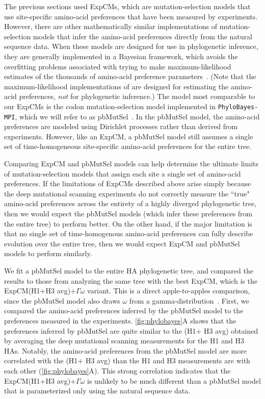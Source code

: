 \documentclass[11pt]{article}
\begin{document}
The previous sections used ExpCMs, which are mutation-selection models that use site-specific amino-acid preferences that have been measured by experiments. 
However, there are other mathematically similar implementations of mutation-selection models that infer the amino-acid preferences directly from the natural sequence data. 
When these models are designed for use in phylogenetic inference, they are generally implemented in a Bayesian framework, which avoids the overfitting problems associated with trying to make maximum-likelihood estimates of the thousands of amino-acid preference parameters~\citep{lartillot2014overcoming}.
(Note that the maximum-likelihood implementations of \citet{tamuri2012estimating,tamuri2014penalized} are designed for estimating the amino-acid preferences, \emph{not} for phylogenetic inference.)
The model most comparable to our ExpCMs is the codon mutation-selection model implemented in \texttt{PhyloBayes-MPI}, which we will refer to as pbMutSel~\citep{rodrigue2014site}. 
In the pbMutSel model, the amino-acid preferences are modeled using Dirichlet processes rather than derived from experiments. 
However, like an ExpCM, a pbMutSel model still assumes a single set of time-homogeneous site-specific amino-acid preferences for the entire tree.

Comparing ExpCM and pbMutSel models can help determine the ultimate limits of mutation-selection models that assign each site a single set of amino-acid preferences. 
If the limitations of ExpCMs described above arise simply because the deep mutational scanning experiments do not correctly measure the ``true" amino-acid preferences across the entirety of a highly diverged phylogenetic tree, then we would expect the pbMutSel models (which infer these preferences from the entire tree) to perform better.
On the other hand, if the major limitation is that no single set of time-homogenous amino-acid preferences can fully describe evolution over the entire tree, then we would expect ExpCM and pbMutSel models to perform similarly.

We fit a pbMutSel model to the entire HA phylogenetic tree, and compared the results to those from analyzing the same tree with the best ExpCM, which is the ExpCM(H1+H3 avg)+$\Gamma\omega$ variant.
This is a direct apple-to-apples comparison, since the pbMutSel model also draws $\omega$ from a gamma-distribution~\citep{rodrigue2014site}.
First, we compared the amino-acid preferences inferred by the pbMutSel model to the preferences measured in the experiments.
\ref{fig:phylobayes}A shows that the preferences inferred by pbMutSel are quite similar to the (H1+ H3 avg) obtained by averaging the deep mutational scanning measurements for the H1 and H3 HAs. 
Notably, the amino-acid preferences from the pbMutSel model are more correlated with the (H1+ H3 avg) than the H1 and H3 measurements are with each other (\ref{fig:phylobayes}A).
This strong correlation indicates that the ExpCM(H1+H3 avg)+$\Gamma\omega$ is unlikely to be much different than a pbMutSel model that is parameterized only using the natural sequence data.  
\end{document}
